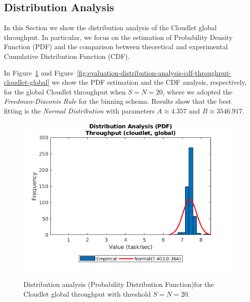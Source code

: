 \subsection{Distribution Analysis}
\label{sec:evaluation-distribution-analysis}
In this Section we show the distribution analysis of the Cloudlet global throughput. 
In particular, we focus on the estimation of Probability Density Function (PDF) and the comparison between theoretical and experimental Cumulative Distribution Function (CDF).

In Figure~\ref{fig:evaluation-distribution-analysis-pdf-throughput-cloudlet-global} and  Figure~\ref{fig:evaluation-distribution-analysis-cdf-throughput-cloudlet-global} we show the PDF estimation and the CDF analysis, respectively, for the global Cloudlet throughput when $S=N=20$, where we adopted the \textit{Freedman-Diaconis Rule} for the binning schema.
Results show that the best fitting is the \textit{Normal Distribution} with parameters $A\approx4.357$ and $B\approx3546.917$.

\begin{figure}
	\includegraphics[width=\columnwidth]{fig/evaluation-distribution-analysis-pdf-throughput-cloudlet-global}
	\caption{Distribution analysis (Probability Distribution Function)for the Cloudlet global throughput with threshold $S=N=20$.}
	\label{fig:evaluation-distribution-analysis-pdf-throughput-cloudlet-global}
\end{figure}

